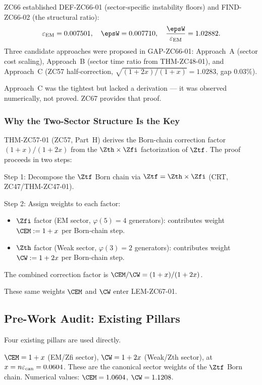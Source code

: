 \documentclass[12pt, a4paper]{article}
\renewcommand{\epsEM}{\varepsilon_{\rm EM}}
\renewcommand{\epscan}{\varepsilon_{\rm can}}
\begin{document}
ZC66 established DEF-ZC66-01 (sector-specific instability floors)
and FIND-ZC66-02 (the structural ratio):
\[
  \epsEM = 0.007501,\quad
  \epsW  = 0.007710,\quad
  \frac{\epsW}{\epsEM} = 1.02882.
\]
Three candidate approaches were proposed in GAP-ZC66-01:
Approach~A (sector cost scaling), Approach~B (sector time ratio
from THM-ZC48-01), and Approach~C (ZC57 half-correction,
$\sqrt{(1+2x)/(1+x)} = 1.0283$, gap $0.03\%$).

Approach~C was the tightest but lacked a derivation ---
it was observed numerically, not proved.
ZC67 provides that proof.

\subsubsection{Why the Two-Sector Structure Is the Key}

THM-ZC57-01 (ZC57, Part~H) derives the Born-chain correction
factor $(1+x)/(1+2x)$ from the $\Zth \times \Zfi$ factorization
of $\Ztf$.
The proof proceeds in two steps:

\begin{openqbox}[title={THM-ZC57-01 Sector Structure (ZC57, Part~H)}]
Step 1: Decompose the $\Ztf$ Born chain via
$\Ztf = \Zth \times \Zfi$ (CRT, ZC47/THM-ZC47-01).

Step 2: Assign weights to each factor:
\begin{itemize}[leftmargin=2em,noitemsep]
  \item $\Zfi$ factor (EM sector, $\varphi(5)=4$ generators):
    contributes weight $\CEM := 1+x$ per Born-chain step.
  \item $\Zth$ factor (Weak sector, $\varphi(3)=2$ generators):
    contributes weight $\CW := 1+2x$ per Born-chain step.
\end{itemize}
The combined correction factor is $\CEM/\CW = (1+x)/(1+2x)$.

These same weights $\CEM$ and $\CW$ enter LEM-ZC67-01.
\end{openqbox}

\subsection{Pre-Work Audit: Existing Pillars}
\label{sec:pwa}

Four existing pillars are used directly.

\begin{formalbox}[title={Pillar 1: Two-Sector Weights (ZC57/THM-ZC57-01)}]
$\CEM = 1+x$ (EM/Zfi sector),
$\CW = 1+2x$ (Weak/Zth sector),
at $x = n\epscan = 0.0604$.
These are the canonical sector weights of the $\Ztf$ Born chain.
Numerical values: $\CEM = 1.0604$, $\CW = 1.1208$.
\end{formalbox}
\end{document}
